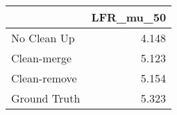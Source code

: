 \begin{tabular}{lr}
\toprule
{} & LFR_mu_50 \\
\midrule
No Clean Up  &     4.148 \\
Clean-merge  &     5.123 \\
Clean-remove &     5.154 \\
Ground Truth &     5.323 \\
\bottomrule
\end{tabular}
